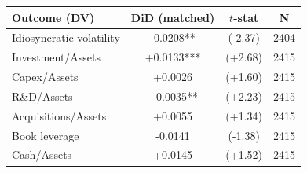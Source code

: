 \begin{tabular}{lccc}
\toprule
Outcome (DV) & DiD (matched) & $t$-stat & N \\
\midrule
Idiosyncratic volatility & -0.0208** & (-2.37) & 2404 \\
Investment/Assets & +0.0133*** & (+2.68) & 2415 \\
Capex/Assets & +0.0026 & (+1.60) & 2415 \\
R\&D/Assets & +0.0035** & (+2.23) & 2415 \\
Acquisitions/Assets & +0.0055 & (+1.34) & 2415 \\
Book leverage & -0.0141 & (-1.38) & 2415 \\
Cash/Assets & +0.0145 & (+1.52) & 2415 \\
\bottomrule
\end{tabular}